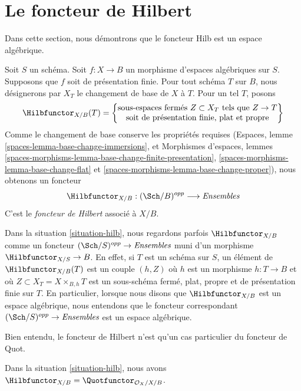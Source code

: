 \section{Le foncteur de Hilbert}
\label{section-hilb}

\noindent
Dans cette section, nous démontrons que le foncteur Hilb est un espace
algébrique.

\begin{situation}
\label{situation-hilb}
Soit $S$ un schéma. Soit $f : X \to B$ un morphisme d'espaces algébriques sur
$S$. Supposons que $f$ soit de présentation finie. Pour tout schéma $T$ sur
$B$, nous désignerons par $X_T$ le changement de base de $X$ à $T$. Pour un
tel $T$, posons
$$
\Hilbfunctor_{X/B}(T) =
\left\{
\begin{matrix}
\text{sous-espaces fermés }Z \subset X_T\text{ tels que }Z \to T\\
\text{soit de présentation finie, plat et propre}
\end{matrix}
\right\}
$$
Comme le changement de base conserve les propriétés requises (Espaces, lemme
\ref{spaces-lemma-base-change-immersions}, et Morphismes d'espaces, lemmes
\ref{spaces-morphisms-lemma-base-change-finite-presentation},
\ref{spaces-morphisms-lemma-base-change-flat} et
\ref{spaces-morphisms-lemma-base-change-proper}), nous obtenons un foncteur
\begin{equation}
\label{equation-hilb}
\Hilbfunctor_{X/B} : (\Sch/B)^{opp} \longrightarrow \textit{Ensembles}
\end{equation}
C'est le {\it foncteur de Hilbert} associé à $X/B$.
\end{situation}

\noindent
Dans la situation \ref{situation-hilb}, nous regardons parfois
$\Hilbfunctor_{X/B}$ comme un foncteur
$(\Sch/S)^{opp} \to \textit{Ensembles}$ muni d'un morphisme
$\Hilbfunctor_{X/S} \to B$. En effet, si $T$ est un schéma sur $S$, un
élément de $\Hilbfunctor_{X/B}(T)$ est un couple $(h, Z)$ où $h$ est un
morphisme $h : T \to B$ et où $Z \subset X_T = X \times_{B, h} T$ est un
sous-schéma fermé, plat, propre et de présentation finie sur $T$. En
particulier, lorsque nous disons que $\Hilbfunctor_{X/B}$ est un espace
algébrique, nous entendons que le foncteur correspondant
$(\Sch/S)^{opp} \to \textit{Ensembles}$ est un espace algébrique.

\medskip\noindent
Bien entendu, le foncteur de Hilbert n'est qu'un cas particulier du foncteur
de Quot.

\begin{lemma}
\label{lemma-hilb-is-quot}
Dans la situation \ref{situation-hilb}, nous avons
$\Hilbfunctor_{X/B} = \Quotfunctor_{\mathcal{O}_X/X/B}$.
\end{lemma}


